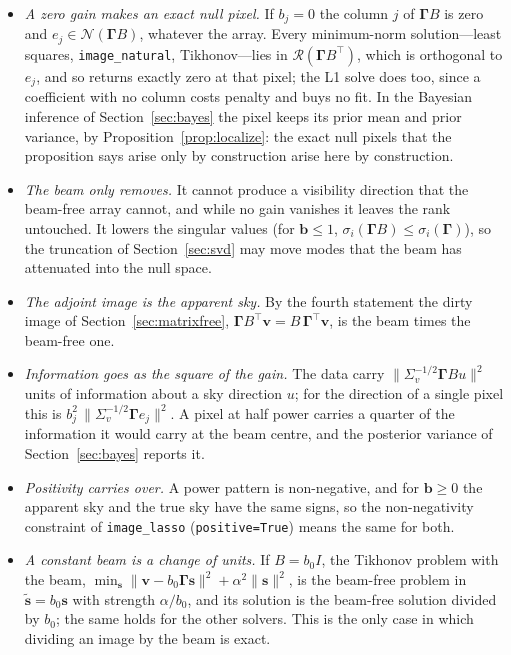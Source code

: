 \documentclass[11pt,a4paper]{article}
\newcommand{\Gammam}{\boldsymbol{\Gamma}}
\newcommand{\svec}{\boldsymbol{s}}
\newcommand{\vvec}{\boldsymbol{v}}
\newcommand{\bvec}{\boldsymbol{b}}
\newcommand{\Gammab}{\Gammam B}
\begin{document}
\begin{itemize}
\item \emph{A zero gain makes an exact null pixel.} If $b_j=0$ the column
  $j$ of $\Gammab$ is zero and $e_j\in\mathcal{N}(\Gammab)$, whatever the
  array. Every minimum-norm solution---least squares,
  \texttt{image\_natural}, Tikhonov---lies in
  $\mathcal{R}(\Gammab^{\!\top})$, which is orthogonal to $e_j$, and so
  returns exactly zero at that pixel; the L1 solve does too, since a
  coefficient with no column costs penalty and buys no fit. In the Bayesian
  inference of Section~\ref{sec:bayes} the pixel keeps its prior mean and
  prior variance, by Proposition~\ref{prop:localize}: the exact null pixels
  that the proposition says arise only by construction arise here by
  construction.
\item \emph{The beam only removes.} It cannot produce a visibility direction
  that the beam-free array cannot, and while no gain vanishes it leaves the
  rank untouched. It lowers the singular values (for $\bvec\le1$,
  $\sigma_i(\Gammab)\le\sigma_i(\Gammam)$), so the truncation of
  Section~\ref{sec:svd} may move modes that the beam has attenuated into the
  null space.
\item \emph{The adjoint image is the apparent sky.} By the fourth statement
  the dirty image of Section~\ref{sec:matrixfree},
  $\Gammab^{\!\top}\vvec=B\,\Gammam^{\!\top}\vvec$, is the beam times the
  beam-free one.
\item \emph{Information goes as the square of the gain.} The data carry
  $\|\Sigma_v^{-1/2}\Gammab u\|^{2}$ units of information about a sky
  direction $u$; for the direction of a single pixel this is
  $b_j^{2}\,\|\Sigma_v^{-1/2}\Gammam e_j\|^{2}$. A pixel at half power
  carries a quarter of the information it would carry at the beam centre, and
  the posterior variance of Section~\ref{sec:bayes} reports it.
\item \emph{Positivity carries over.} A power pattern is non-negative, and
  for $\bvec\ge0$ the apparent sky and the true sky have the same signs, so
  the non-negativity constraint of \texttt{image\_lasso}
  (\texttt{positive=True}) means the same for both.
\item \emph{A constant beam is a change of units.} If $B=b_0I$, the Tikhonov
  problem with the beam,
  $\min_{\svec}\|\vvec-b_0\Gammam\svec\|^{2}+\alpha^{2}\|\svec\|^{2}$, is the
  beam-free problem in $\tilde{\svec}=b_0\svec$ with strength
  $\alpha/b_0$, and its solution is the beam-free solution divided by $b_0$;
  the same holds for the other solvers. This is the only case in which
  dividing an image by the beam is exact.
\end{itemize}
\end{document}
